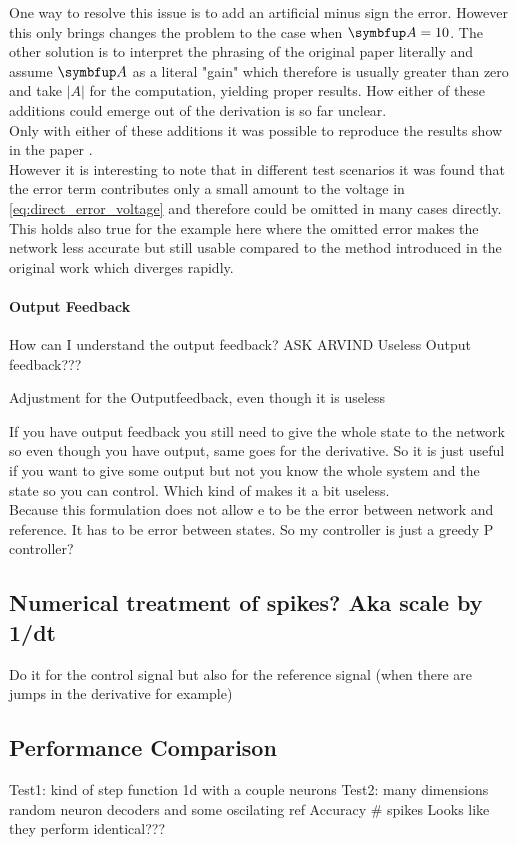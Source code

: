 One way to resolve this issue is to add an artificial minus sign the error. However this only brings changes the problem to the case when $\bmu{A} = 10$. The other solution is to interpret the phrasing of the original paper literally and assume $\bmu{A}$ as a literal "gain" which therefore is usually greater than zero and take $|A|$ for the computation, yielding proper results. How either of these additions could emerge out of the derivation is so far unclear.\\
Only with either of these additions it was possible to reproduce the results show in the paper \cite{huang_spiking_2019}.\\
However it is interesting to note that in different test scenarios it was found that the error term contributes only a small amount to the voltage in \cref{eq:direct_error_voltage} and therefore could be omitted in many cases directly.
This holds also true for the example here where the omitted error makes the network less accurate but still usable compared to the method introduced in the original work which diverges rapidly.\\

\paragraph{Output Feedback}
How can I understand the output feedback? ASK ARVIND
Useless Output feedback???

Adjustment for the Outputfeedback, even though it is useless

If you have output feedback you still need to give the whole state to the network
so even though you have output, same goes for the derivative. So it is just useful if you want to give some output but not you know the whole system and the state so you can control. Which kind of makes it a bit useless.\\
Because this formulation does not allow e to be the error between network and reference. It has to be error between states. So my controller is just a greedy P controller?


\subsection{Numerical treatment of spikes? Aka scale by 1/dt}
Do it for the control signal but also for the reference signal (when there are jumps in the derivative for example)
\subsection{Performance Comparison}
Test1: kind of step function 1d with a couple neurons
Test2: many dimensions random neuron decoders and some oscilating ref
Accuracy
\# spikes
Looks like they perform identical???


